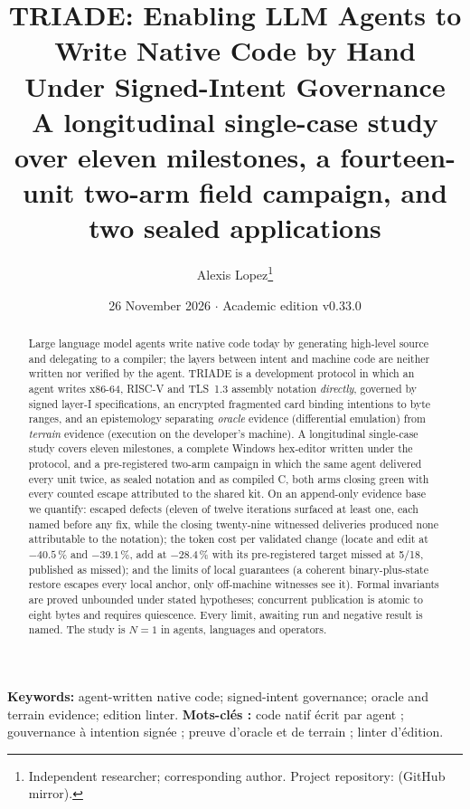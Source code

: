 \documentclass[10pt,a4paper]{article}
\title{\textbf{TRIADE: Enabling LLM Agents to Write Native Code by Hand\\
Under Signed-Intent Governance\\
\large A longitudinal single-case study over eleven milestones, a
fourteen-unit two-arm field campaign, and two sealed applications}}
\author{Alexis Lopez\thanks{Independent researcher; corresponding author.
Project repository: \code{alexisfrlopez-debug/triade} (GitHub mirror).}}
\date{26 November 2026 $\cdot$ Academic edition v0.33.0}
\begin{document}
\maketitle
\thispagestyle{fancy}

\begin{abstract}
\noindent Large language model agents write native code today by generating
high-level source and delegating to a compiler; the layers between intent and
machine code are neither written nor verified by the agent. TRIADE is a
development protocol in which an agent writes x86-64, RISC-V and TLS~1.3
assembly notation \emph{directly}, governed by signed layer-I specifications,
an encrypted fragmented card binding intentions to byte ranges, and an
epistemology separating \emph{oracle} evidence (differential emulation) from
\emph{terrain} evidence (execution on the developer's machine). A longitudinal
single-case study covers eleven milestones, a complete Windows hex-editor
written under the protocol, and a pre-registered two-arm campaign in which the
same agent delivered every unit twice, as sealed notation and as compiled C,
both arms closing green with every counted escape attributed to the shared kit.
On an append-only evidence base we quantify: escaped defects (eleven of twelve
iterations surfaced at least one, each named before any fix, while the closing
twenty-nine witnessed deliveries produced none attributable to the notation);
the token cost per validated change (locate and edit at $-40.5$\,\% and
$-39.1$\,\%, add at $-28.4$\,\% with its pre-registered target missed at 5/18,
published as missed); and the limits of local guarantees (a coherent
binary-plus-state restore escapes every local anchor, only off-machine witnesses
see it). Formal invariants are proved unbounded under stated hypotheses;
concurrent publication is atomic to eight bytes and requires quiescence. Every
limit, awaiting run and negative result is named. The study is $N=1$ in agents,
languages and operators.
\end{abstract}
\vspace{-1mm}
\noindent\textbf{Keywords:} agent-written native code; signed-intent governance;
oracle and terrain evidence; edition linter.\vspace{1mm}
\vspace{-1mm}
\noindent\textbf{Mots-clés :} code natif écrit par agent ; gouvernance à intention
signée ; preuve d'oracle et de terrain ; linter d'édition.\vspace{1mm}
\end{document}
